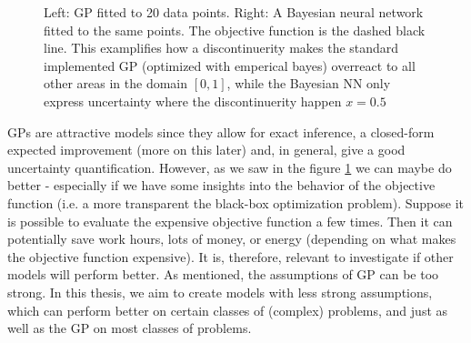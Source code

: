 \begin{figure}[H]%
    \centering
    \qquad
    \caption{Left: GP fitted to 20 data points. Right: A Bayesian neural network fitted to the same points.
    The objective function is the dashed black line. This examplifies how a discontinuerity makes the 
    standard implemented GP (optimized with emperical bayes) overreact to all other areas in the domain $[0,1]$,
    while the Bayesian NN only express uncertainty where the discontinuerity happen $x = 0.5$}%
    \label{fig:GP_vs_BNN}
\end{figure}



GPs are attractive models since they allow for exact inference, a closed-form expected improvement
 (more on this later) and, in general, give a good uncertainty quantification. However, as we saw in
 the figure \ref{fig:GP_vs_BNN} we can maybe do better - especially if we have some insights into
 the behavior of the objective function (i.e. a more transparent the black-box optimization
 problem). Suppose it is possible to evaluate the expensive objective function a few times. Then it
 can potentially save work hours, lots of money, or energy (depending on what makes the objective
 function expensive). It is, therefore, relevant to investigate if other models will perform better.
 As mentioned, the assumptions of GP can be too strong. In this thesis, we aim to create models with
 less strong assumptions, which can perform better on certain classes of (complex) problems, and
 just as well as the GP on most classes of problems. 


